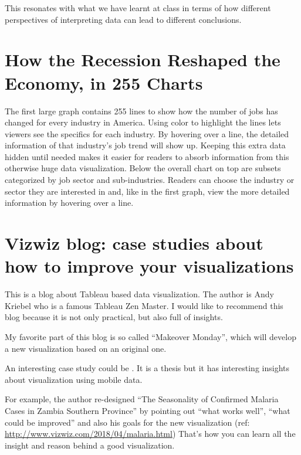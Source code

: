 \documentclass[]{book}
\theoremstyle{definition}
\theoremstyle{definition}
\theoremstyle{definition}
\theoremstyle{remark}
\begin{document}
This resonates with what we have learnt at class in terms of how
different perspectives of interpreting data can lead to different
conclusions.

\section{How the Recession Reshaped the Economy, in 255
Charts}\label{how-the-recession-reshaped-the-economy-in-255-charts}

\citep{recession_economy}

The first large graph contains 255 lines to show how the number of jobs
has changed for every industry in America. Using color to highlight the
lines lets viewers see the specifics for each industry. By hovering over
a line, the detailed information of that industry's job trend will show
up. Keeping this extra data hidden until needed makes it easier for
readers to absorb information from this otherwise huge data
visualization. Below the overall chart on top are subsets categorized by
job sector and sub-industries. Readers can choose the industry or sector
they are interested in and, like in the first graph, view the more
detailed information by hovering over a line.

\section{Vizwiz blog: case studies about how to improve your
visualizations}\label{vizwiz-blog-case-studies-about-how-to-improve-your-visualizations}

This is a blog about Tableau based data visualization. The author is
Andy Kriebel who is a famous Tableau Zen Master. I would like to
recommend this blog because it is not only practical, but also full of
insights.

My favorite part of this blog is so called ``Makeover Monday'', which
will develop a new visualization based on an original one.

An interesting case study could be \citep{case_thesis}. It is a thesis
but it has interesting insights about visualization using mobile data.

For example, the author re-designed ``The Seasonality of Confirmed
Malaria Cases in Zambia Southern Province'' by pointing out ``what works
well'', ``what could be improved'' and also his goals for the new
visualization (ref: \url{http://www.vizwiz.com/2018/04/malaria.html})
That's how you can learn all the insight and reason behind a good
visualization. \citep{vizwiz_malaria}
\end{document}
